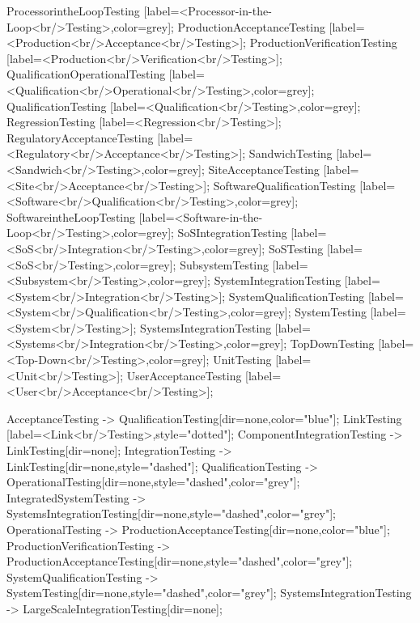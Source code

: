 \documentclass{article}
\begin{document}
{ProcessorintheLoopTesting [label=<Processor-in-the-Loop<br/>Testing>,color=grey];
ProductionAcceptanceTesting [label=<Production<br/>Acceptance<br/>Testing>];
ProductionVerificationTesting [label=<Production<br/>Verification<br/>Testing>];
QualificationOperationalTesting [label=<Qualification<br/>Operational<br/>Testing>,color=grey];
QualificationTesting [label=<Qualification<br/>Testing>,color=grey];
RegressionTesting [label=<Regression<br/>Testing>];
RegulatoryAcceptanceTesting [label=<Regulatory<br/>Acceptance<br/>Testing>];
SandwichTesting [label=<Sandwich<br/>Testing>,color=grey];
SiteAcceptanceTesting [label=<Site<br/>Acceptance<br/>Testing>];
SoftwareQualificationTesting [label=<Software<br/>Qualification<br/>Testing>,color=grey];
SoftwareintheLoopTesting [label=<Software-in-the-Loop<br/>Testing>,color=grey];
SoSIntegrationTesting [label=<SoS<br/>Integration<br/>Testing>,color=grey];
SoSTesting [label=<SoS<br/>Testing>,color=grey];
SubsystemTesting [label=<Subsystem<br/>Testing>,color=grey];
SystemIntegrationTesting [label=<System<br/>Integration<br/>Testing>];
SystemQualificationTesting [label=<System<br/>Qualification<br/>Testing>,color=grey];
SystemTesting [label=<System<br/>Testing>];
SystemsIntegrationTesting [label=<Systems<br/>Integration<br/>Testing>,color=grey];
TopDownTesting [label=<Top-Down<br/>Testing>,color=grey];
UnitTesting [label=<Unit<br/>Testing>];
UserAcceptanceTesting [label=<User<br/>Acceptance<br/>Testing>];

AcceptanceTesting -> QualificationTesting[dir=none,color="blue"];
LinkTesting [label=<Link<br/>Testing>,style="dotted"];
ComponentIntegrationTesting -> LinkTesting[dir=none];
IntegrationTesting -> LinkTesting[dir=none,style="dashed"];
QualificationTesting -> OperationalTesting[dir=none,style="dashed",color="grey"];
IntegratedSystemTesting -> SystemsIntegrationTesting[dir=none,style="dashed",color="grey"];
OperationalTesting -> ProductionAcceptanceTesting[dir=none,color="blue"];
ProductionVerificationTesting -> ProductionAcceptanceTesting[dir=none,style="dashed",color="grey"];
SystemQualificationTesting -> SystemTesting[dir=none,style="dashed",color="grey"];
SystemsIntegrationTesting -> LargeScaleIntegrationTesting[dir=none];

}
\end{document}
